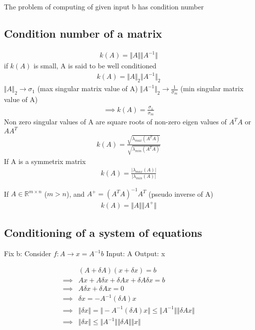 \documentclass{article}
\begin{document}
The problem of computing of given input b has condition number 

\subsection{Condition number of a matrix}
\label{sec:cond-numb-matr}

\begin{align*}
  k(A) = \Vert A \Vert \Vert A^{-1} \Vert
\end{align*}
if $k(A)$ is small, A is said to be well conditioned
\begin{align*}
  k(A) = \Vert A \Vert_2 \Vert A^{-1} \Vert_2
\end{align*}
$\Vert A \Vert_2 \rightarrow \sigma_1$ (max singular matrix value of A)
$\Vert A^{-1} \Vert_2 \rightarrow \frac{1}{\sigma_m}$ (min singular matrix value of A)
\begin{align*}
  \implies k(A) = \frac{\sigma_1}{\sigma_m}
\end{align*}
Non zero singular values of A are square roots of non-zero eigen values of $A^TA$ or $AA^T$
\begin{align*}
  k(A) = \frac{\sqrt{\lambda_{max}(A^TA)}}{\sqrt{\lambda_{min}(A^TA)}}
\end{align*}
If A is a symmetrix matrix
\begin{align*}
  k(A) = \frac{|\lambda_{max}(A)|}{|\lambda_{min}(A)|}
\end{align*}

If $A \in \mathbb{R}^{m \times n}$ ($m > n$), and $A^+ = (A^TA)^{-1}A^T$ (pseudo inverse of A)
\begin{align*}
  k(A) = \Vert A \Vert \Vert A^+ \Vert
\end{align*}

\subsection{Conditioning of a system of equations}
\label{sec:cond-syst-equat}

Fix b:
Consider $f: A \rightarrow x = A^{-1}b$
Input: A
Output: x

\begin{align*}
  &(A + \delta A)(x + \delta x) = b\\
  \implies &Ax + A \delta x + \delta Ax + \delta A \delta x = b\\
  \implies &A \delta x + \delta Ax = 0\\
  \implies &\delta x = -A^{-1}(\delta A)x\\
  \implies &\Vert \delta x \Vert = \Vert -A^{-1}(\delta A)x \Vert
             \leq \Vert A^{-1} \Vert \Vert \delta Ax \Vert\\
  \implies &\boxed{\Vert \delta x \Vert
             \leq \Vert A^{-1} \Vert \Vert \delta A \Vert \Vert x \Vert}\\
\end{align*}
\end{document}

